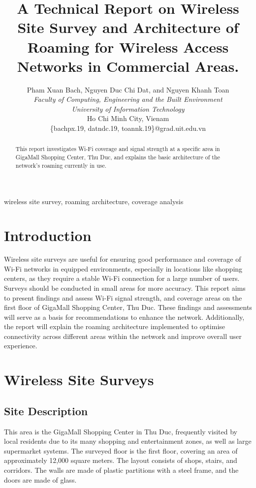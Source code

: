 \documentclass[conference]{IEEEtran}
\title{A Technical Report on Wireless Site Survey and Architecture of Roaming for Wireless Access Networks in Commercial Areas.}
\author{
    Pham Xuan Bach, Nguyen Duc Chi Dat, and Nguyen Khanh Toan\\
    \textit{Faculty of Computing, Engineering and the Built Environment } \\
    \textit{University of Information Technology} \\
    Ho Chi Minh City, Vienam \\
    \{bachpx.19, datndc.19, toannk.19\}@grad.uit.edu.vn
}
\begin{document}
\maketitle

\begin{abstract}
This report investigates Wi-Fi coverage and signal strength at a specific area in GigaMall Shopping Center, Thu Duc, and explains the basic architecture of the network's roaming currently in use.
\end{abstract}

\begin{IEEEkeywords}
wireless site survey, roaming architecture, coverage analysis
\end{IEEEkeywords}

\section{Introduction}

Wireless site surveys are useful for ensuring good performance and coverage of Wi-Fi networks in equipped environments, especially in locations like shopping centers, as they require a stable Wi-Fi connection for a large number of users. Surveys should be conducted in small areas for more accuracy. This report aims to present findings and assess Wi-Fi signal strength, and coverage areas on the first floor of GigaMall Shopping Center, Thu Duc. These findings and assessments will serve as a basis for recommendations to enhance the network. Additionally, the report will explain the roaming architecture implemented to optimise connectivity across different areas within the network and improve overall user experience.

\section{Wireless Site Surveys}

\subsection{Site Description}

This area is the GigaMall Shopping Center in Thu Duc, frequently visited by local residents due to its many shopping and entertainment zones, as well as large supermarket systems. The surveyed floor is the first floor, covering an area of approximately 12,000 square meters. The layout consists of shops, stairs, and corridors. The walls are made of plastic partitions with a steel frame, and the doors are made of glass.
\end{document}
